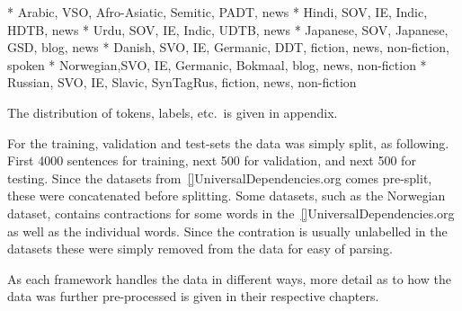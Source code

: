 * Arabic,   VSO, Afro-Asiatic, Semitic, PADT, news
* Hindi,    SOV, IE, Indic,             HDTB, news
* Urdu,     SOV, IE, Indic,             UDTB, news
* Japanese, SOV, Japanese,              GSD, blog, news
* Danish,   SVO, IE, Germanic,          DDT, fiction, news, non-fiction, spoken
* Norwegian,SVO, IE, Germanic,          Bokmaal, blog, news, non-fiction
* Russian,  SVO, IE, Slavic,            SynTagRus, fiction, news, non-fiction

The distribution of tokens, labels, etc.\ is given in appendix.

For the training, validation and test-sets the data was simply split, as following. 
First 4000 sentences for training, next 500 for validation, and next 500 for testing.
Since the datasets from~\ref{}{UniversalDependencies.org} comes pre-split, these were concatenated before splitting.
Some datasets, such as the Norwegian dataset, contains contractions for some words in the~\ref{}{UniversalDependencies.org} as well as the individual words.
Since the contration is usually unlabelled in the datasets these were simply removed from the data for easy of parsing.

As each framework handles the data in different ways, more detail as to how the data was further pre-processed is given in their respective chapters.
